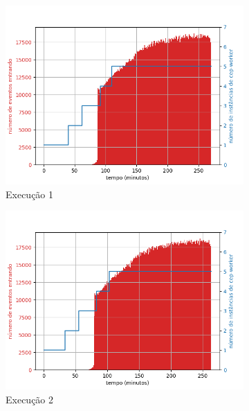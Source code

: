  \afterpage{\clearpage}
\begin{figure}[h!]
\begin{subfigure}{.5\textwidth}
  \centering
  \includegraphics[width=\linewidth]{figuras/graphics/carga_e_workers_total5-dez-su.png}  
  \caption{Execução 1}
  \label{fig:cewt-5-dez-su}
\end{subfigure}
\begin{subfigure}{.5\textwidth}
  \centering
  \includegraphics[width=\linewidth]{figuras/graphics/carga_e_workers_total7-dez-su.png}  
  \caption{Execução 2}
  \label{fig:cewt-7-dez-su}
\end{subfigure}
\begin{subfigure}{.5\textwidth}

\end{subfigure}
\end{figure}
